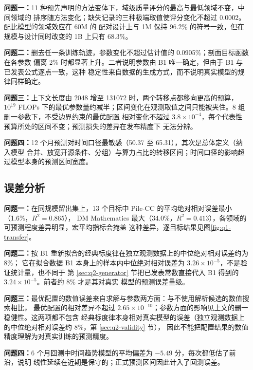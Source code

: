 \textbf{问题一：}11 种预先声明的方法变体下，域级质量评分的最高与最低领域不变，中间领域的
排序随方法变化；缺失记录的三种极端取值使评分变化不超过 0.0002。配比模型的领域效应在 60M 的
配对设计上与 1M 保持 96.2\% 的符号一致，但在规模与设计同时改变的 1B 上只有 68.3\%。

\textbf{问题二：}删去任一条训练轨迹，参数变化不超过估计值的 0.0905\%；剖面目标函数在各参数
偏离 2\% 时都显著上升。二者说明参数由 B1 唯一确定，但由于 B1 与已发表公式逐点一致，这种
稳定性来自数据的生成方式，而不说明真实模型的规律同样确定。

\textbf{问题三：}上下文长度由 2048 增至 131072 时，两个转移点都移向更高的预算，$10^{19}$ FLOPs
下的最优参数量约减半；区间变化在观测取值之间只能被夹住。8 组删一参数下，不受边界约束的最优配置
相对变化不超过 $3.8\times10^{-4}$，每个代表性预算所处的区间不变；预测损失的差异在发布精度下
无法分辨。

\textbf{问题四：}12 个月预测对时间口径最敏感（50.37 至 65.31），其次是总体定义（纳入模型
合并、放宽开源条件、分组）与算力占比的转移区间；时间口径的影响超过模型本身的预测区间宽度。

\subsection{误差分析}

\textbf{问题一：}在同规模留出集上，13 个目标中 Pile-CC 的平均绝对相对误差最小（1.6\%，$R^2=0.865$），
DM Mathematics 最大（34.0\%，$R^2=0.413$），各领域的可预测程度差异明显，宏平均指标会掩盖
这种差异，逐目标结果见图\ref{fig:q1-transfer}。

\textbf{问题二：}按 B1 重新拟合的经典标度律在独立观测数据上的中位绝对相对误差约为 8\%；
它在拟合数据 B1 本身上的样本内中位绝对相对误差为 $3.26\times10^{-5}$，不是验证统计量，也不同于
第 \ref{sec:q2-generator} 节把已发表常数直接代入 B1 得到的 $3.24\times10^{-5}$。前者约 8\% 才是其对真实
模型的预测误差量级。

\textbf{问题三：}最优配置的数值误差来自求解与参数两方面：与不使用解析候选的数值搜索相比，
最优配置的相对差异不超过 $2.65\times10^{-10}$；参数方面的影响见上文的删一稳健性。这两项都不包含
经典标度律本身相对真实模型的误差（独立观测数据上的中位绝对相对误差约 8\%，第 \ref{sec:q2-validity} 节），
因此不能把配置结果的数值精度理解为对真实训练的预测精度。

\textbf{问题四：}6 个月回测中时间趋势模型的平均偏差为 $-5.49$ 分，每次都低估了前沿，说明
线性延续在近期是保守的；正式预测区间因此计入了回测误差。
